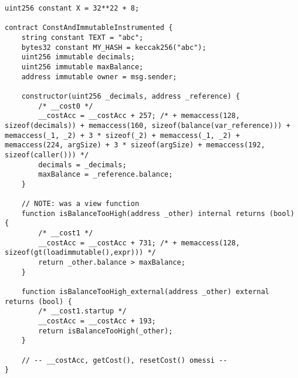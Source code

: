 \documentclass[12pt,a4paper,openright,oneside]{report}
\theoremstyle{definition}
\begin{document}
\begin{lstlisting}[language=Solidity,caption={Instrumentazione di \ref{lst:const_and_immutable}},label={lst:const_and_immutable_instrumented},frame=tlrb]
uint256 constant X = 32**22 + 8;

contract ConstAndImmutableInstrumented {
    string constant TEXT = "abc";
    bytes32 constant MY_HASH = keccak256("abc");
    uint256 immutable decimals;
    uint256 immutable maxBalance;
    address immutable owner = msg.sender;
    
    constructor(uint256 _decimals, address _reference) {
        /* __cost0 */
        __costAcc = __costAcc + 257; /* + memaccess(128, sizeof(decimals)) + memaccess(160, sizeof(balance(var_reference))) + memaccess(_1, _2) + 3 * sizeof(_2) + memaccess(_1, _2) + memaccess(224, argSize) + 3 * sizeof(argSize) + memaccess(192, sizeof(caller())) */
        decimals = _decimals;
        maxBalance = _reference.balance;
    }

    // NOTE: was a view function
    function isBalanceTooHigh(address _other) internal returns (bool) {
        /* __cost1 */
        __costAcc = __costAcc + 731; /* + memaccess(128, sizeof(gt(loadimmutable(),expr))) */
        return _other.balance > maxBalance;
    }

    function isBalanceTooHigh_external(address _other) external returns (bool) {
        /* __cost1.startup */
        __costAcc = __costAcc + 193;
        return isBalanceTooHigh(_other);
    }

    // -- __costAcc, getCost(), resetCost() omessi --
}
\end{lstlisting}
\end{document}
